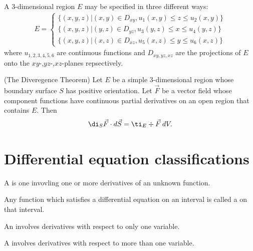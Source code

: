 \documentclass{article}
\begin{document}
\begin{definition}
    A  3-dimensional region $E$ may be specified in three different ways:
    \begin{align*}
        E=\begin{cases}
            \{(x,y,z)|(x,y)\in D_{xy}, u_1(x,y)\leq z \leq u_2(x,y)\}\\
            \{(x,y,z)|(y,z)\in D_{yz}, u_3(y,z)\leq x \leq u_4(y,z)\}\\
            \{(x,y,z)|(x,z)\in D_{xz}, u_5(x,z)\leq y \leq u_6(x,z)\}
        \end{cases}
    \end{align*}
    where $u_{1,2,3,4,5,6}$ are continuous functions and $D_{xy,yz,xz}$ are the projections
    of $E$ onto the $xy$-,$yz$-,$xz$-planes repsectively.
\end{definition}
\begin{theorem}(The Diveregence Theorem)
    Let $E$ be a simple 3-dimensional region whose boundary surface $S$ has positive
    orientation. Let $\vec F$ be a vector field whose component functions have continuous
    partial derivatives on an open region that contains $E$. Then
    \begin{align*}
        \di_S \vec F\cdot d\vec S = \ti_E \div\vec F\:dV.
    \end{align*}
\end{theorem}



\section{Differential equation classifications}



\begin{definition}
    A  is one invovling one or more derivatives of an unknown function.
\end{definition}

\begin{definition}
    Any function which satisfies a differential equation on an interval is called a  on that interval.
\end{definition}

\begin{definition}
    An  involves derivatives with respect to only one variable.
\end{definition}

\begin{definition}
    A  involves derivatives with respect to more than one variable.
\end{definition}
\end{document}
